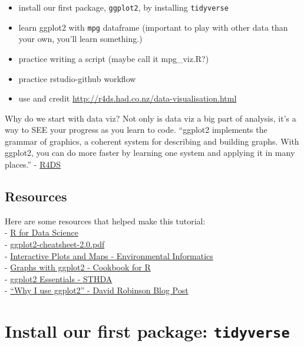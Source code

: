 \documentclass[]{book}
\providecommand{\tightlist}{%
  \setlength{\itemsep}{0pt}\setlength{\parskip}{0pt}}
\theoremstyle{definition}
\theoremstyle{definition}
\theoremstyle{definition}
\theoremstyle{remark}
\begin{document}
\begin{itemize}
\tightlist
\item
  install our first package, \texttt{ggplot2}, by installing
  \texttt{tidyverse}
\item
  learn ggplot2 with \texttt{mpg} dataframe (important to play with
  other data than your own, you'll learn something.)
\item
  practice writing a script (maybe call it mpg\_viz.R?)
\item
  practice rstudio-github workflow
\item
  use and credit \url{http://r4ds.had.co.nz/data-visualisation.html}
\end{itemize}

Why do we start with data viz? Not only is data viz a big part of
analysis, it's a way to SEE your progress as you learn to code.
``ggplot2 implements the grammar of graphics, a coherent system for
describing and building graphs. With ggplot2, you can do more faster by
learning one system and applying it in many places.'' -
\href{http://r4ds.had.co.nz/data-visualisation.html}{R4DS}

\subsection{Resources}\label{resources-1}

Here are some resources that helped make this tutorial:\\
- \href{http://r4ds.had.co.nz/data-visualisation.html}{R for Data
Science}\\
-
\href{../cheatsheets/ggplot2-cheatsheet-2.0.pdf}{ggplot2-cheatsheet-2.0.pdf}\\
-
\href{http://ucsb-bren.github.io/env-info/wk06_widgets.html}{Interactive
Plots and Maps - Environmental Informatics}\\
- \href{http://www.cookbook-r.com/Graphs/\#graphs-with-ggplot2}{Graphs
with ggplot2 - Cookbook for R}\\
- \href{http://www.sthda.com/english/wiki/ggplot2-essentials}{ggplot2
Essentials - STHDA}\\
- \href{http://varianceexplained.org/r/why-I-use-ggplot2/}{``Why I use
ggplot2'' - David Robinson Blog Post}

\section{\texorpdfstring{Install our first package:
\texttt{tidyverse}}{Install our first package: tidyverse}}\label{install-our-first-package-tidyverse}
\end{document}
